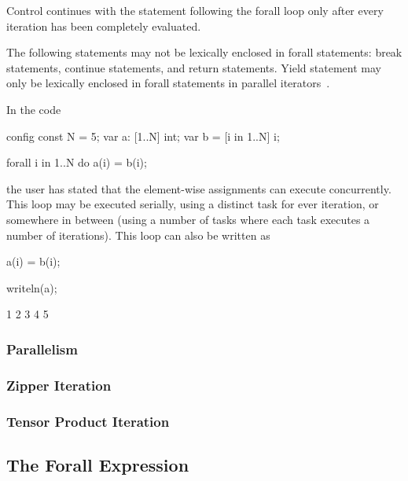 Control continues with the statement following the forall loop only
after every iteration has been completely evaluated.

The following statements may not be lexically enclosed in forall
statements: break statements, continue statements, and return
statements.  Yield statement may only be lexically enclosed in forall
statements in parallel iterators~.

\begin{example}
In the code
\begin{chapelpre}
config const N = 5;
var a: [1..N] int;
var b = [i in 1..N] i;
\end{chapelpre}
\begin{chapel}
forall i in 1..N do
  a(i) = b(i);
\end{chapel}
the user has stated that the element-wise assignments can execute
concurrently.  This loop may be executed serially, using a distinct
task for ever iteration, or somewhere in between (using a number of
tasks where each task executes a number of iterations).  This loop can
also be written as
\begin{chapel}
[i in 1..N] a(i) = b(i);
\end{chapel}
\begin{chapelpost}
writeln(a);
\end{chapelpost}
\begin{chapeloutput}
1 2 3 4 5
\end{chapeloutput}
\end{example}

\subsubsection{Parallelism}
\label{forall_parallelism}

\subsubsection{Zipper Iteration}
\label{forall_zipper}

\subsubsection{Tensor Product Iteration}
\label{forall_tensor}



\subsection{The Forall Expression}
\label{Forall_Expressions}

